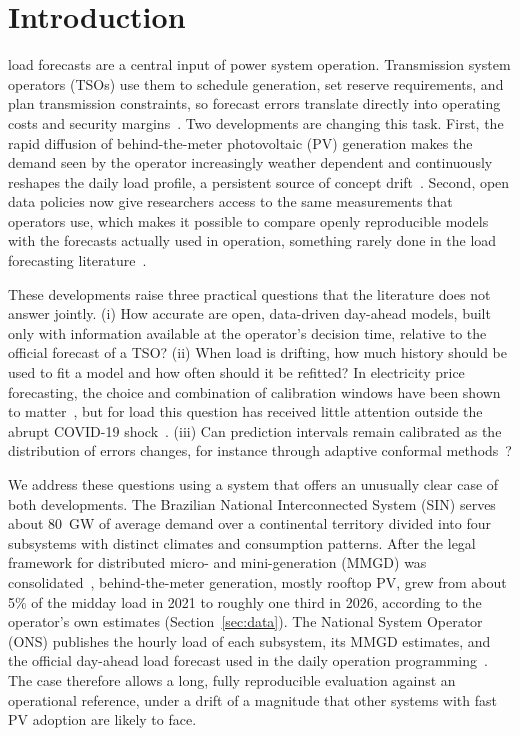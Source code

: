 \section{Introduction}
\label{sec:introduction}

 load forecasts are a central input of power system operation. Transmission system operators (TSOs) use them to schedule generation, set reserve requirements, and plan transmission constraints, so forecast errors translate directly into operating costs and security margins~\cite{hong2016tutorial,hong2020outlook}. Two developments are changing this task. First, the rapid diffusion of behind-the-meter photovoltaic (PV) generation makes the demand seen by the operator increasingly weather dependent and continuously reshapes the daily load profile, a persistent source of concept drift~\cite{gama2014drift}. Second, open data policies now give researchers access to the same measurements that operators use, which makes it possible to compare openly reproducible models with the forecasts actually used in operation, something rarely done in the load forecasting literature~\cite{hong2020outlook,petropoulos2022forecasting}.

These developments raise three practical questions that the literature does not answer jointly. (i) How accurate are open, data-driven day-ahead models, built only with information available at the operator's decision time, relative to the official forecast of a TSO? (ii) When load is drifting, how much history should be used to fit a model and how often should it be refitted? In electricity price forecasting, the choice and combination of calibration windows have been shown to matter~\cite{marcjasz2018windows,hubicka2019windows}, but for load this question has received little attention outside the abrupt COVID-19 shock~\cite{obst2021covid}. (iii) Can prediction intervals remain calibrated as the distribution of errors changes, for instance through adaptive conformal methods~\cite{gibbs2021aci,zaffran2022aci}?

We address these questions using a system that offers an unusually clear case of both developments. The Brazilian National Interconnected System (SIN) serves about 80~GW of average demand over a continental territory divided into four subsystems with distinct climates and consumption patterns. After the legal framework for distributed micro- and mini-generation (MMGD) was consolidated~\cite{lei14300}, behind-the-meter generation, mostly rooftop PV, grew from about 5\% of the midday load in 2021 to roughly one third in 2026, according to the operator's own estimates (Section~\ref{sec:data}). The National System Operator (ONS) publishes the hourly load of each subsystem, its MMGD estimates, and the official day-ahead load forecast used in the daily operation programming~\cite{ons_opendata,ons_apicarga}. The case therefore allows a long, fully reproducible evaluation against an operational reference, under a drift of a magnitude that other systems with fast PV adoption are likely to face.

